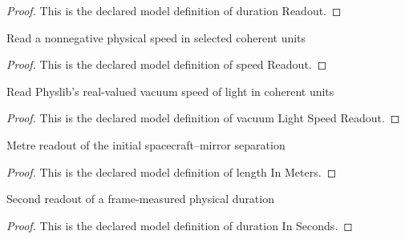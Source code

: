 \begin{proof}
  This is the declared model definition of duration Readout.
\end{proof}
\begin{definition}
  \label{def:physics:phyx-mini-0528:phyxminiproblems-problemphyxmini0528-speedreadout}
  Read a nonnegative physical speed in selected coherent units
\end{definition}
\begin{proof}
  This is the declared model definition of speed Readout.
\end{proof}
\begin{definition}
  \label{def:physics:phyx-mini-0528:phyxminiproblems-problemphyxmini0528-vacuumlightspeedreadout}
  Read Physlib's real-valued vacuum speed of light in coherent units
\end{definition}
\begin{proof}
  This is the declared model definition of vacuum Light Speed Readout.
\end{proof}
\begin{definition}
  \label{def:physics:phyx-mini-0528:phyxminiproblems-problemphyxmini0528-lengthinmeters}
  Metre readout of the initial spacecraft--mirror separation
\end{definition}
\begin{proof}
  This is the declared model definition of length In Meters.
\end{proof}
\begin{definition}
  \label{def:physics:phyx-mini-0528:phyxminiproblems-problemphyxmini0528-durationinseconds}
  Second readout of a frame-measured physical duration
\end{definition}
\begin{proof}
  This is the declared model definition of duration In Seconds.
\end{proof}
